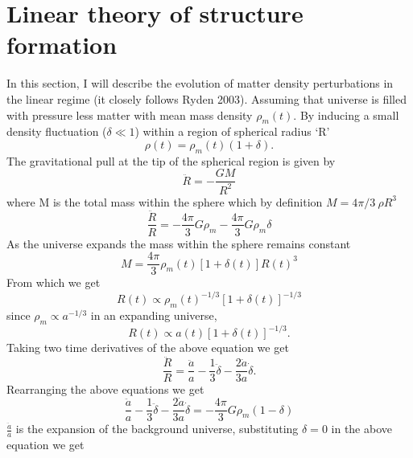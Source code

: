 \section{Linear theory of structure formation}
\label{growth}
In this section, I will describe the evolution of matter density perturbations in the linear regime (it closely follows Ryden 2003).
Assuming that universe is filled with pressure less matter with mean mass density $\rho_{m}(t)$. 
By inducing a small density fluctuation ($\delta \ll 1$) within a region of spherical radius `R'
\begin{equation}
\rho(t) = \rho_{m}(t)(1+\delta).
\end{equation}
 The gravitational pull at the tip of the spherical region is given by 
\begin{equation}
\ddot{R} = -\frac{GM}{R^{2}}
\end{equation} 
where M is the total mass within the sphere which by definition $M = 4 \pi /3 \: \rho R^{3}$
\begin{equation}
\frac{\ddot{R}}{R}= -\frac{4\pi}{3} G\rho_{m} - \frac{4\pi}{3} G \rho_{m} \delta 
\end{equation}
As the universe expands the mass within the sphere remains constant
\begin{equation}
M = \frac{4\pi}{3} \rho_{m}(t)[1+\delta(t)]R(t)^{3}
\end{equation}
From which we get 
\begin{equation}
R(t) \propto \rho_{m}(t)^{-1/3}[1+\delta(t)]^{-1/3}
\end{equation}
since $\rho_{m} \propto a^{-1/3}$ in an expanding universe,
\begin{equation}
R(t) \propto a(t)[1+\delta(t)]^{-1/3}.
\end{equation}
Taking two time derivatives of the above equation we get
\begin{equation}
\frac{\ddot{R}}{R}  = \frac{\ddot{a}}{a} - \frac{1}{3}\ddot{\delta} - \frac{2\dot{a}}{3a} \dot{\delta} .
\end{equation}
Rearranging the above equations we get 
\begin{equation}
\frac{\ddot{a}}{a} - \frac{1}{3}\ddot{\delta} - \frac{2\dot{a}}{3a} \dot{\delta} = -\frac{4 \pi}{3} G\rho_{m} (1-\delta)
\label{eq1}
\end{equation}
$\frac{\ddot{a}}{a}$ is the expansion of the background universe, substituting $\delta = 0$ in the above equation we get
